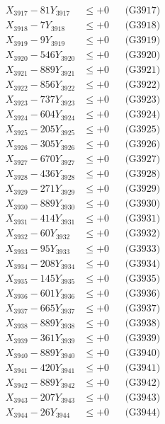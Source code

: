 \documentclass[a4paper,10pt]{article}
\begin{document}
{\begin{align}
X_{3917} - 81Y_{3917} &\leq +0 && \text{(G3917)} \\
X_{3918} - 7Y_{3918} &\leq +0 && \text{(G3918)} \\
X_{3919} - 9Y_{3919} &\leq +0 && \text{(G3919)} \\
X_{3920} - 546Y_{3920} &\leq +0 && \text{(G3920)} \\
\allowbreak
X_{3921} - 889Y_{3921} &\leq +0 && \text{(G3921)} \\
X_{3922} - 856Y_{3922} &\leq +0 && \text{(G3922)} \\
X_{3923} - 737Y_{3923} &\leq +0 && \text{(G3923)} \\
X_{3924} - 604Y_{3924} &\leq +0 && \text{(G3924)} \\
X_{3925} - 205Y_{3925} &\leq +0 && \text{(G3925)} \\
X_{3926} - 305Y_{3926} &\leq +0 && \text{(G3926)} \\
X_{3927} - 670Y_{3927} &\leq +0 && \text{(G3927)} \\
X_{3928} - 436Y_{3928} &\leq +0 && \text{(G3928)} \\
X_{3929} - 271Y_{3929} &\leq +0 && \text{(G3929)} \\
X_{3930} - 889Y_{3930} &\leq +0 && \text{(G3930)} \\
\allowbreak
X_{3931} - 414Y_{3931} &\leq +0 && \text{(G3931)} \\
X_{3932} - 60Y_{3932} &\leq +0 && \text{(G3932)} \\
X_{3933} - 95Y_{3933} &\leq +0 && \text{(G3933)} \\
X_{3934} - 208Y_{3934} &\leq +0 && \text{(G3934)} \\
X_{3935} - 145Y_{3935} &\leq +0 && \text{(G3935)} \\
X_{3936} - 601Y_{3936} &\leq +0 && \text{(G3936)} \\
X_{3937} - 665Y_{3937} &\leq +0 && \text{(G3937)} \\
X_{3938} - 889Y_{3938} &\leq +0 && \text{(G3938)} \\
X_{3939} - 361Y_{3939} &\leq +0 && \text{(G3939)} \\
X_{3940} - 889Y_{3940} &\leq +0 && \text{(G3940)} \\
\allowbreak
X_{3941} - 420Y_{3941} &\leq +0 && \text{(G3941)} \\
X_{3942} - 889Y_{3942} &\leq +0 && \text{(G3942)} \\
X_{3943} - 207Y_{3943} &\leq +0 && \text{(G3943)} \\
X_{3944} - 26Y_{3944} &\leq +0 && \text{(G3944)} \\

\end{align}}
\end{document}
